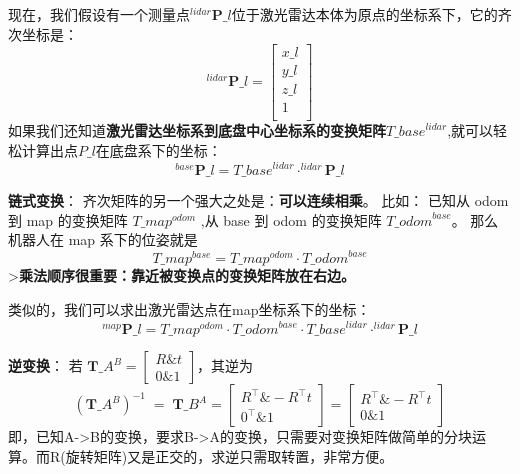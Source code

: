 \documentclass[a4paper,12pt]{book}
\begin{document}
{现在，我们假设有一个测量点$^{lidar}\mathbf{P}\_{l}$位于激光雷达本体为原点的坐标系下，它的齐次坐标是：  
$$
^{lidar}\mathbf{P}\_{l} = 
\begin{bmatrix}
x\_l \\
y\_l \\
z\_l \\
1 \\
\end{bmatrix}$$  
如果我们还知道\textbf{激光雷达坐标系到底盘中心坐标系的变换矩阵$T\_{base}^{lidar}$},就可以轻松计算出点$P\_l$在底盘系下的坐标：
$$
^{base}\mathbf{P}\_{l} = T\_{base}^{lidar} ⋅ ^{lidar}\mathbf{P}\_{l}
$$  

\textbf{链式变换}：
齐次矩阵的另一个强大之处是：\textbf{可以连续相乘}。
比如：  已知从 odom 到 map 的变换矩阵 $T\_{map}^{odom}$  ,从 base 到 odom 的变换矩阵 $T\_{odom}^{base}$。
那么机器人在 map 系下的位姿就是
$$
 T\_{map}^{base} = T\_{map}^{odom}  · T\_{odom}^{base} 
$$
>\textbf{乘法顺序很重要：靠近被变换点的变换矩阵放在右边。}   

类似的，我们可以求出激光雷达点在map坐标系下的坐标：
$$
^{map}\mathbf{P}\_{l} = T\_{map}^{odom}  · T\_{odom}^{base} · T\_{base}^{lidar} ⋅ ^{lidar}\mathbf{P}\_{l}
$$  

\textbf{逆变换}：  
若 $\mathbf{T}\_{A}^{B}=\begin{bmatrix}R \& t\\0\&1\end{bmatrix}$，其逆为  
$$
(\mathbf{T}\_{A}^{B})^{-1} \;=\; \mathbf{T}\_{B}^{A} = 
\begin{bmatrix}
R^\top \& -R^\top t \\
0^\top \& 1
\end{bmatrix} =
\begin{bmatrix}
R^\top \& -R^\top t \\
0 \& 1
\end{bmatrix}
$$  
即，已知A->B的变换，要求B->A的变换，只需要对变换矩阵做简单的分块运算。而R(旋转矩阵)又是正交的，求逆只需取转置，非常方便。


}
\end{document}
